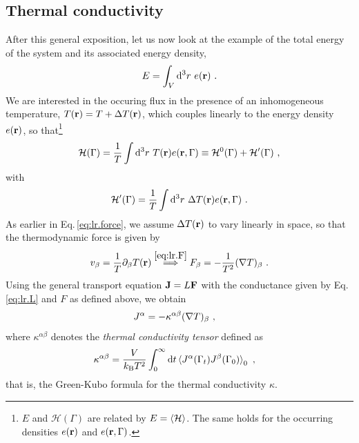 \subsection{Thermal conductivity}
\label{sec:Thermal.Conductivity}
After this general exposition, let us now look at the example of the total energy of the system and its associated energy density,
\begin{align}
	E = \int_V \d^3 r ~ e(\b r)~.
	\label{eq:lr.E}
\end{align}
We are interested in the occuring flux in the presence of an inhomogeneous temperature, $T({\bf r}) = T + \Delta T({\bf r})$, which couples linearly to the energy density  $e ({\bf r})$, so that\footnote{$E$ and $\mathcal H(\Gamma)$ are related by $E = \braket{\mathcal H}$. The same holds for the occurring densities $e({\bf r})$ and $e ({\bf r}, \Gamma)$.}
\begin{align}
	\mathcal H (\Gamma) = \frac{1}{T} \int {\rm d}^3 r ~ T ({\bf r}) e({\bf r}, \Gamma) 
		\equiv \mathcal H^0 (\Gamma) + \mathcal H' (\Gamma)~,
\end{align}
with
\begin{align}
	\mathcal H' (\Gamma) = \frac{1}{T} \int \d^3 r ~ \Delta T (\b r) e(\b r, \Gamma)~.
	\label{eq:lr.Hp.temp}
\end{align}
As earlier in Eq.\,\eqref{eq:lr.force}, we assume $\Delta T({\bf r})$ to vary linearly in space, so that the thermodynamic force is given by
\begin{align}
	v_\beta = \frac{1}{T} \partial_\beta T (\b r) 
		\stackrel{\eqref{eq:lr.F}}{\implies}
	F_\beta = - \frac{1}{T^2} (\b \nabla T)_\beta ~.
	\label{eq:lr.F.temp}
\end{align}
Using the general transport equation ${\bf J} = L {\bf F}$ with the conductance given by Eq.\,\eqref{eq:lr.L} and $F$ as defined above, we obtain
\begin{align}
	J^\alpha 
		&= - \kappa^{\alpha \beta} (\b \nabla T)_\beta~,
	\label{eq:lr.J.2}
\end{align}
where $\kappa^{\alpha \beta}$ denotes the \emph{thermal conductivity tensor} defined as
\begin{align}
	\kappa^{\alpha \beta}
		&=
		\frac{V}{k_{\rm B} T^2} \int_{0}^{\infty} 
		\d t \braket{J^\alpha (\Gamma_t) J^\beta (\Gamma_{0})}_0 ~,
	\label{eq:GreenKubo}
\end{align}
that is, the Green-Kubo formula for the thermal conductivity $\kappa$.

